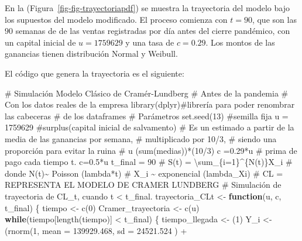 \documentclass[
  us-letterpaper,
]{scrreprt}
\newenvironment{Shaded}{\begin{snugshade}}{\end{snugshade}}
\newcommand{\AttributeTok}[1]{\textcolor[rgb]{0.40,0.45,0.13}{#1}}
\newcommand{\CommentTok}[1]{\textcolor[rgb]{0.37,0.37,0.37}{#1}}
\newcommand{\ControlFlowTok}[1]{\textcolor[rgb]{0.00,0.23,0.31}{\textbf{#1}}}
\newcommand{\DecValTok}[1]{\textcolor[rgb]{0.68,0.00,0.00}{#1}}
\newcommand{\FloatTok}[1]{\textcolor[rgb]{0.68,0.00,0.00}{#1}}
\newcommand{\FunctionTok}[1]{\textcolor[rgb]{0.28,0.35,0.67}{#1}}
\newcommand{\NormalTok}[1]{\textcolor[rgb]{0.00,0.23,0.31}{#1}}
\newcommand{\OtherTok}[1]{\textcolor[rgb]{0.00,0.23,0.31}{#1}}
\newcommand{\SpecialCharTok}[1]{\textcolor[rgb]{0.37,0.37,0.37}{#1}}
\theoremstyle{plain}
\theoremstyle{plain}
\theoremstyle{definition}
\theoremstyle{remark}
\begin{document}
En la (Figura~\ref{fig-fig-trayectoriapdf}) se muestra la trayectoria
del modelo bajo los supuestos del modelo modificado. El proceso comienza
con \(t = 90\), que son las \(90\) semanas de de las ventas registradas
por día antes del cierre pandémico, con un capital inicial de
\(u= 1759629\) y una tasa de \(c= 0.29\). Los montos de las ganancias
tienen distribución Normal y Weibull.

El código que genera la trayectoria es el siguiente:

\begin{Shaded}
\begin{Highlighting}[]
\CommentTok{\# Simulación Modelo Clásico de Cramér{-}Lundberg }
\CommentTok{\# Antes de la pandemia}
\CommentTok{\# Con los datos reales de la empresa}
\FunctionTok{library}\NormalTok{(dplyr)}\CommentTok{\#librería para poder renombrar las cabeceras }
\CommentTok{\# de los dataframes}
\CommentTok{\# Parámetros}
\FunctionTok{set.seed}\NormalTok{(}\DecValTok{13}\NormalTok{) }\CommentTok{\#semilla fija}
\NormalTok{u }\OtherTok{=} \DecValTok{1759629} \CommentTok{\#surplus(capital inicial de salvamento)}
\CommentTok{\# Es un estimado a partir de la media de las ganancias por semana, }
\CommentTok{\# multiplicado por 10/3, }
\CommentTok{\# siendo una proporción para evitar la ruina}
\CommentTok{\# u (sum(medias))*(10/3)}
\NormalTok{c }\OtherTok{=}\FloatTok{0.29}\SpecialCharTok{*}\NormalTok{u }\CommentTok{\# prima de pago cada tiempo t. c=0.5*u}
\NormalTok{t\_final }\OtherTok{=} \DecValTok{90}
\CommentTok{\# S(t) = \textbackslash{}sum\_\{i=1\}\^{}\{N(t)\}X\_i}
\CommentTok{\# donde N(t)\textasciitilde{} Poisson (lambda*t)}
\CommentTok{\# X\_i \textasciitilde{} exponencial (lambda\_Xi)}
\CommentTok{\# CL = REPRESENTA EL MODELO DE CRAMER LUNDBERG}
\CommentTok{\# Simulación de trayectoria de CL\_t, cuando t \textless{} t\_final.}
\NormalTok{trayectoria\_CLt }\OtherTok{\textless{}{-}} \ControlFlowTok{function}\NormalTok{(u, c, t\_final)}
\NormalTok{\{}
\NormalTok{  tiempo }\OtherTok{\textless{}{-}} \FunctionTok{c}\NormalTok{(}\DecValTok{0}\NormalTok{)}
\NormalTok{  Cramer\_trayectoria }\OtherTok{\textless{}{-}} \FunctionTok{c}\NormalTok{(u)}
  \ControlFlowTok{while}\NormalTok{(tiempo[}\FunctionTok{length}\NormalTok{(tiempo)] }\SpecialCharTok{\textless{}}\NormalTok{ t\_final)}
\NormalTok{  \{}
\NormalTok{    tiempo\_llegada }\OtherTok{\textless{}{-}}\NormalTok{ (}\DecValTok{1}\NormalTok{)}
\NormalTok{  Y\_i }\OtherTok{\textless{}{-}}\NormalTok{  (}\FunctionTok{rnorm}\NormalTok{(}\DecValTok{1}\NormalTok{, }\AttributeTok{mean =} \FloatTok{139929.468}\NormalTok{, }\AttributeTok{sd =} \FloatTok{24521.524}\NormalTok{ )  }\SpecialCharTok{+} 

\end{Highlighting}
\end{Shaded}
\end{document}
